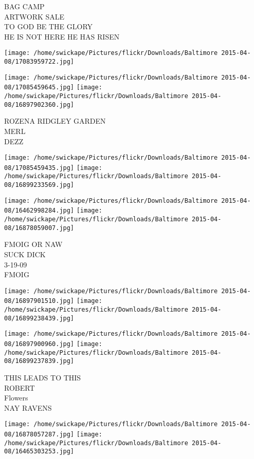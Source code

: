 \documentclass[10pt,letterpaper]{article}
\begin{document}
BAG CAMP\\
ARTWORK SALE\\
TO GOD BE THE GLORY\\
HE IS NOT HERE HE HAS RISEN\\
\pagebreak

\texttt{[image: /home/swickape/Pictures/flickr/Downloads/Baltimore 2015-04-08/17083959722.jpg]}

\vspace{0.25in}
\texttt{[image: /home/swickape/Pictures/flickr/Downloads/Baltimore 2015-04-08/17085459645.jpg]}
\texttt{[image: /home/swickape/Pictures/flickr/Downloads/Baltimore 2015-04-08/16897902360.jpg]}

ROZENA RIDGLEY GARDEN\\
MERL\\
DEZZ\\
\pagebreak

\texttt{[image: /home/swickape/Pictures/flickr/Downloads/Baltimore 2015-04-08/17085459435.jpg]}
\texttt{[image: /home/swickape/Pictures/flickr/Downloads/Baltimore 2015-04-08/16899233569.jpg]}

\texttt{[image: /home/swickape/Pictures/flickr/Downloads/Baltimore 2015-04-08/16462998284.jpg]}
\texttt{[image: /home/swickape/Pictures/flickr/Downloads/Baltimore 2015-04-08/16878059007.jpg]}

FMOIG OR NAW\\
SUCK DICK\\
3{-}19{-}09\\
FMOIG\\
\pagebreak

\texttt{[image: /home/swickape/Pictures/flickr/Downloads/Baltimore 2015-04-08/16897901510.jpg]}
\texttt{[image: /home/swickape/Pictures/flickr/Downloads/Baltimore 2015-04-08/16899238439.jpg]}

\texttt{[image: /home/swickape/Pictures/flickr/Downloads/Baltimore 2015-04-08/16897900960.jpg]}
\texttt{[image: /home/swickape/Pictures/flickr/Downloads/Baltimore 2015-04-08/16899237839.jpg]}

THIS LEADS TO THIS\\
ROBERT\\
Flowers\\
NAY RAVENS\\
\pagebreak

\texttt{[image: /home/swickape/Pictures/flickr/Downloads/Baltimore 2015-04-08/16878057287.jpg]}
\texttt{[image: /home/swickape/Pictures/flickr/Downloads/Baltimore 2015-04-08/16465303253.jpg]}
\end{document}
